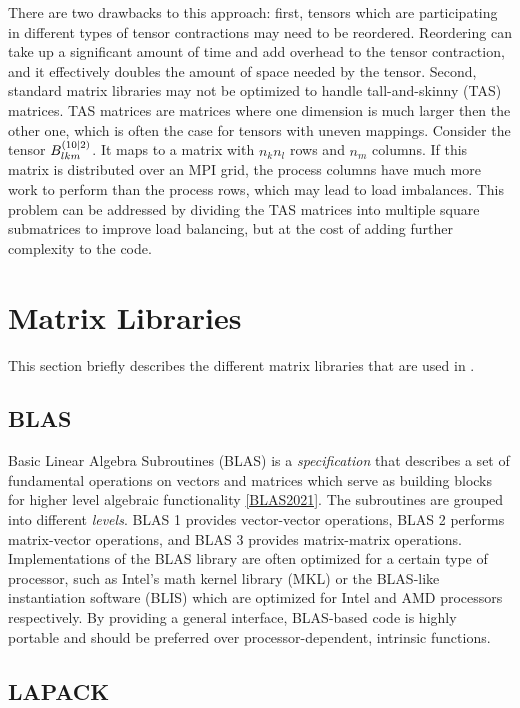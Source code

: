 There are two drawbacks to this approach: first, tensors which are participating in different types of tensor contractions may need to be reordered. Reordering can take up a significant amount of time and add overhead to the tensor contraction, and it effectively doubles the amount of space needed by the tensor. Second, standard matrix libraries may not be optimized to handle tall-and-skinny (TAS) matrices. TAS matrices are matrices where one dimension is much larger then the other one, which is often the case for tensors with uneven mappings. Consider the tensor  $B_{lkm}^{\left( 10 \mid 2 \right)}$. It maps to a matrix with $n_kn_l$ rows and $n_m$ columns. If this matrix is distributed over an MPI grid, the process columns have much more work to perform than the process rows, which may lead to load imbalances. This problem can be addressed by dividing the TAS matrices into multiple square submatrices to improve load balancing, but at the cost of adding further complexity to the code.

\section{Matrix Libraries}

This section briefly describes the different matrix libraries that are used in \mchem{}.

\subsection{BLAS}

Basic Linear Algebra Subroutines (BLAS) is a \emph{specification} that describes a set of fundamental operations on vectors and matrices which serve as building blocks for higher level algebraic functionality \ref{BLAS2021}. The subroutines are grouped into different \emph{levels}. BLAS 1 provides vector-vector operations, BLAS 2 performs matrix-vector operations, and BLAS 3 provides matrix-matrix operations. Implementations of the BLAS library are often optimized for a certain type of processor, such as Intel's math kernel library (MKL) or the BLAS-like instantiation software (BLIS) which are optimized for Intel and AMD processors respectively. By providing a general interface, BLAS-based code is highly portable and should be preferred over processor-dependent, intrinsic functions. 

\subsection{LAPACK}

